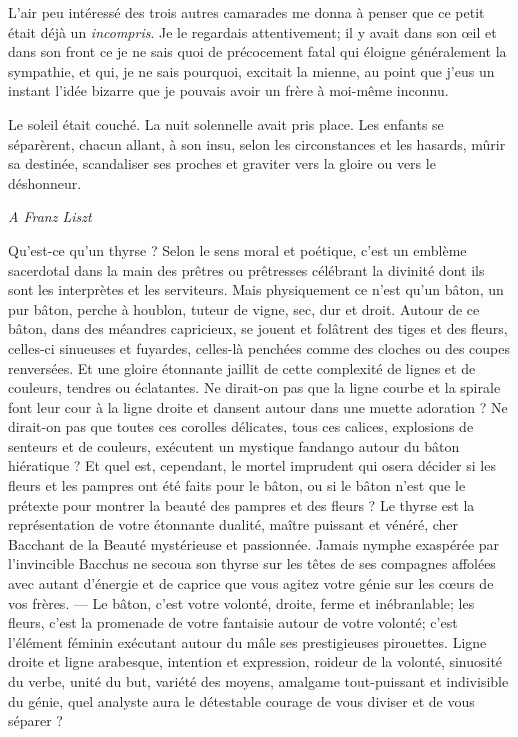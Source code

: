 L’air peu intéressé des trois autres camarades me donna
à penser que ce petit était déjà un \textit{incompris}. Je le regardais
attentivement; il y avait dans son \oe il et dans son front ce je ne sais
quoi de précocement fatal qui éloigne généralement la sympathie, et
qui, je ne sais pourquoi, excitait la mienne, au point que
j’eus un instant l’idée bizarre que
je pouvais avoir un frère à moi{}-même inconnu.

Le soleil était couché. La nuit solennelle avait pris place. Les enfants
se séparèrent, chacun allant, à son insu, selon les circonstances et
les hasards, mûrir sa destinée, scandaliser ses proches et graviter
vers la gloire ou vers le déshonneur.


 
\begin{flushright}
\textit{A Franz Liszt}
\end{flushright}

Qu’est{}-ce qu’un thyrse ? Selon le
sens moral et poétique, c’est un emblème sacerdotal
dans la main des prêtres ou prêtresses célébrant la divinité dont ils
sont les interprètes et les serviteurs. Mais physiquement ce
n’est qu’un bâton, un pur bâton,
perche à houblon, tuteur de vigne, sec, dur et droit. Autour de ce
bâton, dans des méandres capricieux, se jouent et folâtrent des tiges
et des fleurs, celles{}-ci sinueuses et fuyardes, celles{}-là penchées
comme des cloches ou des coupes renversées. Et une gloire étonnante
jaillit de cette complexité de lignes et de couleurs, tendres ou
éclatantes. Ne dirait{}-on pas que la ligne courbe et la spirale font
leur cour à la ligne droite et dansent autour dans une muette adoration
? Ne dirait{}-on pas que toutes ces corolles délicates, tous ces
calices, explosions de senteurs et de couleurs, exécutent un mystique
fandango autour du bâton hiératique ? Et quel est, cependant, le mortel
imprudent qui osera décider si les fleurs et les pampres ont été faits
pour le bâton, ou si le bâton n’est que le prétexte
pour montrer la beauté des pampres et des fleurs ? Le thyrse est la
représentation de votre étonnante dualité, maître puissant et vénéré,
cher Bacchant de la Beauté mystérieuse et passionnée. Jamais nymphe
exaspérée par l’invincible Bacchus ne secoua son
thyrse sur les têtes de ses compagnes affolées avec autant
d’énergie et de caprice que vous agitez votre génie
sur les c\oe urs de vos frères. --- Le bâton, c’est votre
volonté, droite, ferme et inébranlable; les fleurs,
c’est la promenade de votre fantaisie autour de votre
volonté; c’est l’élément féminin
exécutant autour du mâle ses prestigieuses pirouettes. Ligne droite et
ligne arabesque, intention et expression, roideur de la volonté,
sinuosité du verbe, unité du but, variété des moyens, amalgame
tout{}-puissant et indivisible du génie, quel analyste aura le
détestable courage de vous diviser et de vous séparer ?

